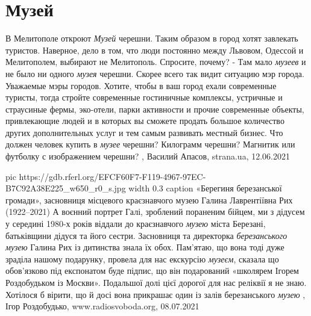  
 
 
 
 
\chapter{Музей}
\label{sec:slova.muzej}

В Мелитополе откроют \emph{Музей} черешни.  Таким образом в город хотят
завлекать туристов.  Наверное, дело в том, что люди постоянно между Львовом,
Одессой и Мелитополем, выбирают не Мелитополь. Спросите, почему? - Там мало
\emph{музеев} и не было ни одного \emph{музея} черешни. Скорее всего так видит
ситуацию мэр города.  Уважаемые мэры городов. Хотите, чтобы в ваш город ехали
современные туристы, тогда стройте современные гостиничные комплексы, устричные
и страусиные фермы, эко-отели, парки активности и прочие современные объекты,
привлекающие людей и в которых вы сможете продать большое количество других
дополнительных услуг и тем самым развивать местный бизнес.  Что должен человек
купить в \emph{музее} черешни? Килограмм черешни? Магнитик или футболку с
изображением черешни?
, Василий Апасов, strana.ua, 12.06.2021 

\ifcmt
  pic https://gdb.rferl.org/EFCF60F7-F119-4967-97EC-B7C92A38E225_w650_r0_s.jpg
	width 0.3
	caption «Берегиня березанської громади», засновниця місцевого краєзнавчого музею Галина Лаврентіївна Рих (1922–2021)
\fi
А воєнний портрет Галі, зроблений пораненим бійцем, ми з дідусем у середині
1980-х років віддали до краєзнавчого \emph{музею} міста Березані, батьківщини дідуся
та його сестри. Засновниця та директорка \emph{березанського музею} Галина Рих із
дитинства знала їх обох. Пам’ятаю, що вона тоді дуже зраділа нашому подарунку,
провела для нас екскурсію \emph{музеєм}, сказала що обов’язково під експонатом буде
підпис, що він подарований «школярем Ігорем Роздобудьком із Москви». Подальшої
долі цієї дорогої для нас реліквії я не знаю. Хотілося б вірити, що й досі вона
прикрашає один із залів березанського \emph{музею}
, 
Ігор Роздобудько, www.radiosvoboda.org, 08.07.2021

